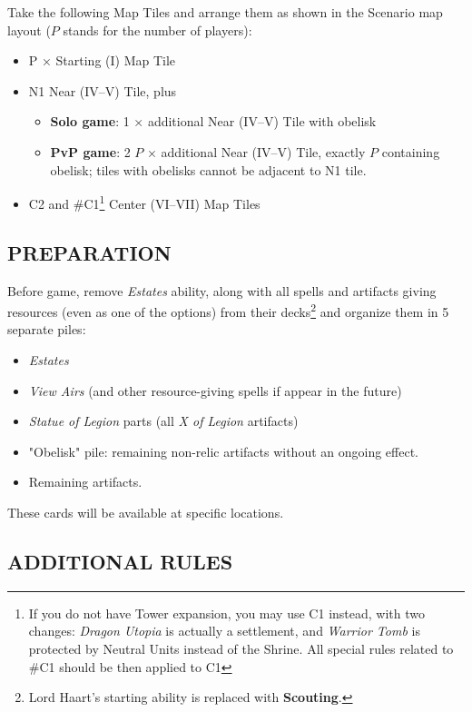 \begin{multicols*}{2}
Take the following Map Tiles and arrange them as shown in the Scenario map layout ($P$ stands for the number of players):
\begin{itemize}
  \item P × Starting (I) Map Tile
  \item N1 Near (IV--V) Tile, plus \begin{itemize}
  	\item \textbf{Solo game}: 1 × additional Near (IV--V) Tile with obelisk
  	\item \textbf{PvP game}: 2 $P$ × additional Near (IV--V) Tile, exactly $P$ containing obelisk; tiles with obelisks cannot be adjacent to N1 tile.
  \end{itemize}
  \item C2 and \#C1\footnote{If you do not have Tower expansion, you may use C1 instead, with two changes: \textit{Dragon Utopia} is actually a settlement, and \textit{Warrior Tomb} is protected by Neutral Units instead of the Shrine. All special rules related to \#C1 should be then applied to C1} Center (VI--VII) Map Tiles
\end{itemize}

\subsection*{\MakeUppercase{Preparation}}

Before game, remove \textit{Estates} ability, along with all spells and artifacts giving resources (even as one of the options) from their decks\footnote{Lord Haart's starting ability is replaced with \textbf{Scouting}.} and organize them in 5 separate piles:

\begin{itemize}
	\item \textit{Estates}
	\item \textit{View Airs} (and other resource-giving spells if appear in the future)
	\item \textit{Statue of Legion} parts (all \textit{X of Legion} artifacts)
	\item "Obelisk" pile: remaining non-relic artifacts without an ongoing effect.
	\item Remaining artifacts.
\end{itemize}

These cards will be available at specific locations.

\subsection*{\MakeUppercase{Additional Rules}}


\end{multicols*}
